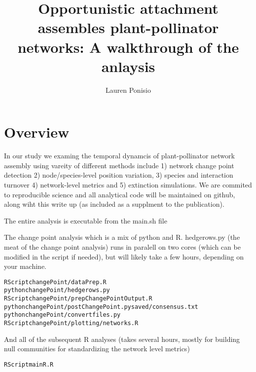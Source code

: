 \documentclass{article}\usepackage[]{graphicx}\usepackage[]{color}
\makeatletter
\newenvironment{kframe}{%
 \def\at@end@of@kframe{}%
 \ifinner\ifhmode%
  \def\at@end@of@kframe{\end{minipage}}%
  \begin{minipage}{\columnwidth}%
 \fi\fi%
 \def\FrameCommand##1{\hskip\@totalleftmargin \hskip-\fboxsep
 \colorbox{shadecolor}{##1}\hskip-\fboxsep
     \hskip-\linewidth \hskip-\@totalleftmargin \hskip\columnwidth}%
 \MakeFramed {\advance\hsize-\width
   \@totalleftmargin\z@ \linewidth\hsize
   \@setminipage}}%
 {\par\unskip\endMakeFramed%
 \at@end@of@kframe}
\newenvironment{knitrout}{}{} %
\makeatother
\begin{document}
\title{Opportunistic attachment assembles plant-pollinator networks: A walkthrough of the anlaysis}
\author{Lauren Ponisio}

\maketitle
\section{Overview}
\label{sec:overview}

In our study we examing the temporal dynamcis of plant-pollinator
network assembly using vareity of different methods include 1) network
change point detection 2) node/species-level position variation, 3)
species and interaction turnover 4) network-level metrics and 5)
extinction simulations. We are commited to reproducible science and
all analytical code will be maintained on github, along wiht this
write up (as included as a supplment to the publication).

The entire analysis is executable from the main.sh file

The change point analysis which is a mix of python and R. hedgerows.py
(the meat of the change point analysis) runs in paralell on two cores
(which can be modified in the script if needed), but will likely take
a few hours, depending on your machine.

\begin{knitrout}
\color{fgcolor}\begin{kframe}
\begin{alltt}
 RScript changePoint/dataPrep.R
 python changePoint/hedgerows.py
 RScript changePoint/prepChangePointOutput.R
 python changePoint/postChangePoint.py saved/consensus.txt
 python changePoint/convertfiles.py
 RScript changePoint/plotting/networks.R
\end{alltt}
\end{kframe}
\end{knitrout}

And all of the subsequent R analyses (takes several hours, mostly for
building null communities for standardizing the network level metrics)

\begin{knitrout}
\color{fgcolor}\begin{kframe}
\begin{alltt}
 RScript mainR.R
\end{alltt}
\end{kframe}
\end{knitrout}
\end{document}
